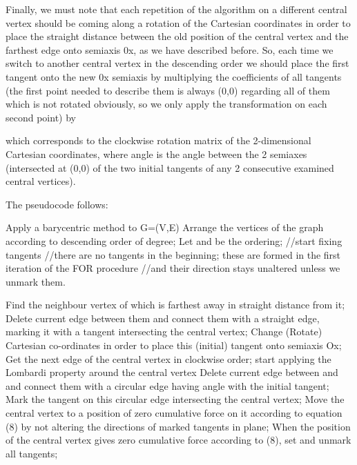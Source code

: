 \documentclass[10pt]{article}
\begin{document}
Finally, we must note that each repetition of the algorithm on a different central vertex should be coming along a rotation of the Cartesian coordinates in order to place the straight distance between the old position of the central vertex and the farthest edge onto semiaxis 0x, as we have described before. So, each time we switch to another central vertex in the descending order we should place the first tangent onto the new 0x semiaxis by multiplying the coefficients of all tangents (the first point needed to describe them is always (0,0) regarding all of them which is not rotated obviously, so we only apply the transformation on each second point) by 

 
which corresponds to the clockwise rotation matrix of the 2-dimensional Cartesian coordinates, where angle  is the angle between the 2 semiaxes (intersected at (0,0) of the two initial tangents of any 2 consecutive examined central vertices).

The pseudocode follows:
\\

\begin{algorithmic}
\REPEAT

\STATE Apply a barycentric method to G=(V,E)
\STATE Arrange the vertices of the graph according to descending order of degree;
\STATE Let  and  be the ordering;
\STATE //start fixing tangents
\STATE //there are no tangents in the beginning; these are formed in the first iteration of the FOR procedure 
\STATE //and their direction stays unaltered unless we unmark them.

   \STATE Find the neighbour vertex of  which is farthest away in straight distance from it; 
   \STATE Delete current edge between them and connect them with a straight edge, marking it with a tangent intersecting the central vertex;
   \STATE Change (Rotate) Cartesian co-ordinates in order to place this (initial) tangent onto semiaxis Ox;
   \STATE Get the next edge of the central vertex in clockwise order;
   \STATE start applying the Lombardi property around the central vertex
        \STATE Delete current edge between  and  and connect them with a circular edge having angle  with the initial tangent;
        \STATE Mark the tangent on this circular edge intersecting the central vertex;
        \STATE 
   \ENDFOR
   \STATE Move the central vertex to a position of zero cumulative force on it according to equation (8) by not altering the directions of marked tangents in plane;
   \STATE When the position of the central vertex gives zero cumulative force according to (8), set  and unmark all tangents;
\ENDFOR
{}
\end{algorithmic}
\end{document}
